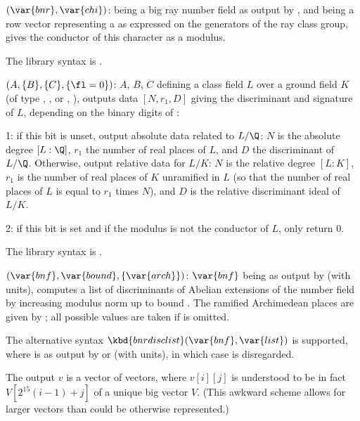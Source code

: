 $(\var{bnr},\var{chi})$: \label{se:bnrconductorofchar} being a big
ray number field as output by , and  being a row vector
representing a  as expressed on the generators of the ray
class group, gives the conductor of this character as a modulus.

The library syntax is .

$(A,\{B\},\{C\},\{\fl=0\})$: \label{se:bnrdisc}$A$, $B$, $C$ defining a class field $L$ over a ground field $K$
(of type ,
,
 or
,
), outputs data $[N,r_1,D]$ giving the discriminant and
signature of $L$, depending on the binary digits of \fl:

\item 1: if this bit is unset, output absolute data related to $L/\Q$:
$N$ is the absolute degree $[L:\Q]$, $r_1$ the number of real places of $L$,
and $D$ the discriminant of $L/\Q$. Otherwise, output relative data for $L/K$:
$N$ is the relative degree $[L:K]$, $r_1$ is the number of real places of $K$
unramified in $L$ (so that the number of real places of $L$ is equal to $r_1$
times $N$), and $D$ is the relative discriminant ideal of $L/K$.

\item 2: if this bit is set and if the modulus is not the conductor of $L$,
only return 0.

The library syntax is .

$(\var{bnf},\var{bound},\{\var{arch}\})$: \label{se:bnrdisclist}$\var{bnf}$ being as output by  (with units), computes a
list of discriminants of Abelian extensions of the number field by increasing
modulus norm up to bound . The ramified Archimedean places are
given by ; all possible values are taken if  is omitted.

The alternative syntax $\kbd{bnrdisclist}(\var{bnf},\var{list})$ is
supported, where  is as output by  or
 (with units), in which case  is disregarded.

The output $v$ is a vector of vectors, where $v[i][j]$ is understood to be in
fact $V[2^{15}(i-1)+j]$ of a unique big vector $V$. (This awkward scheme
allows for larger vectors than could be otherwise represented.)


